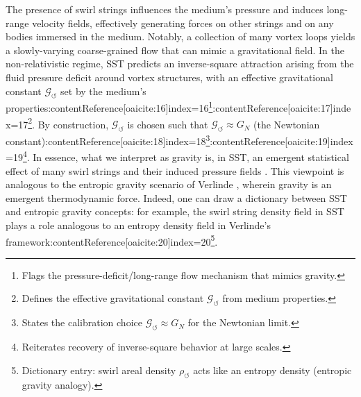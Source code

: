 \documentclass[12pt]{article}
\begin{document}
    The presence of swirl strings influences the medium’s pressure and induces long-range velocity fields, effectively generating forces on other strings and on any bodies immersed in the medium. Notably, a collection of many vortex loops yields a slowly-varying coarse-grained flow that can mimic a gravitational field. In the non-relativistic regime, SST predicts an inverse-square attraction arising from the fluid pressure deficit around vortex structures, with an effective gravitational constant $\mathcal{G}_{\!\boldsymbol{\circlearrowleft}}$ set by the medium’s properties:contentReference[oaicite:16]{index=16}\footnote{Flags the pressure-deficit/long-range flow mechanism that mimics gravity.}:contentReference[oaicite:17]{index=17}\footnote{Defines the effective gravitational constant $\mathcal G_{\!\circlearrowleft}$ from medium properties.}. By construction, $\mathcal{G}_{\!\boldsymbol{\circlearrowleft}}$ is chosen such that $\mathcal{G}_{\!\boldsymbol{\circlearrowleft}}\approx G_N$ (the Newtonian constant):contentReference[oaicite:18]{index=18}\footnote{States the calibration choice $\mathcal G_{\!\circlearrowleft}\approx G_N$ for the Newtonian limit.}:contentReference[oaicite:19]{index=19}\footnote{Reiterates recovery of inverse-square behavior at large scales.}. In essence, what we interpret as gravity is, in SST, an emergent statistical effect of many swirl strings and their induced pressure fields \cite{Iskandarani2025RotatingFrame}. This viewpoint is analogous to the entropic gravity scenario of Verlinde \cite{Verlinde2011,Verlinde2017}, wherein gravity is an emergent thermodynamic force. Indeed, one can draw a dictionary between SST and entropic gravity concepts: for example, the swirl string density field in SST plays a role analogous to an entropy density field in Verlinde’s framework:contentReference[oaicite:20]{index=20}\footnote{Dictionary entry: swirl areal density $\rho_{\!\circlearrowleft}$ acts like an entropy density (entropic gravity analogy).}.
\end{document}
